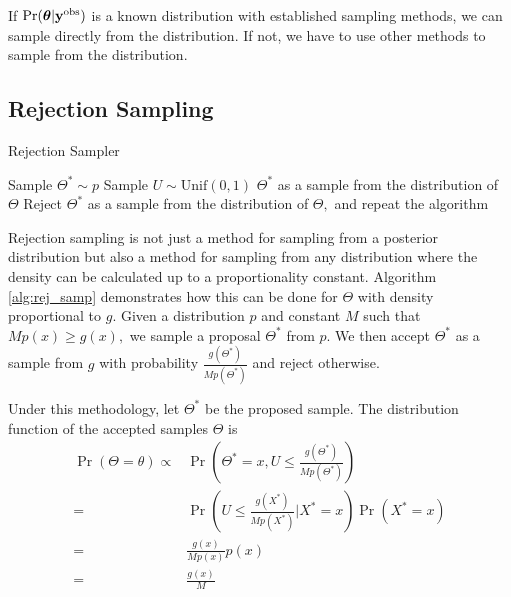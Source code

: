 If $\Pr(\bm{\theta} | \mathbf{y}^{\mathrm{obs}})$ is a known distribution with established
sampling methods, we can sample directly from the distribution. If not, we
have to use other methods to sample from the distribution.

\subsection*{Rejection Sampling}

\begin{algorithm}[htbp]
    \caption{Rejection Sampler}
    \label{alg:rej_samp}
    \begin{algorithmic}
        \State Sample $\Theta^\ast \sim p$
        \State Sample $U \sim \mathrm{Unif}(0, 1)$
        \State \Return $\Theta^\ast$ as a sample from the distribution of
        $\Theta$
        \Else
        \State Reject $\Theta^\ast$ as a sample from the distribution of
        $\Theta,$ and repeat the algorithm
        \EndIf
    \end{algorithmic}
\end{algorithm}

Rejection sampling is not just a method for sampling from a posterior
distribution but also a method for sampling from any distribution
where the density can
be calculated up to a proportionality constant.
Algorithm \ref{alg:rej_samp}
demonstrates how this can be done for $\Theta$ with density proportional to
$g.$ Given a distribution $p$ and constant $M$ such that $Mp(x) \geq g(x),$ we
sample a proposal $\Theta^\ast$ from $p.$ We then accept $\Theta^\ast$ as a
sample from $g$ with probability $\frac{g(\Theta^\ast)}{M p(\Theta^\ast)}$ and
reject otherwise.

Under this methodology, let $\Theta^\ast$ be the proposed sample.
The distribution function of the accepted samples $\Theta$ is
\begin{align*}
    \Pr(\Theta = \theta)
    \propto & \Pr\left(
    \Theta^\ast = x , U \leq \frac{g(\Theta^\ast)}{M p(\Theta^\ast)}
    \right)
    \tag{where the probabilities may be interpreted as densities} \\
    =       & \Pr\left(
    U \leq \frac{g(X^\ast)}{M p(X^\ast)} | X^\ast = x\right) \Pr(X^\ast = x
    )                                                             \\
    =       & \frac{g(x)}{M p(x)} p(x)                            \\
    =       & \frac{g(x)}{M}
\end{align*}

